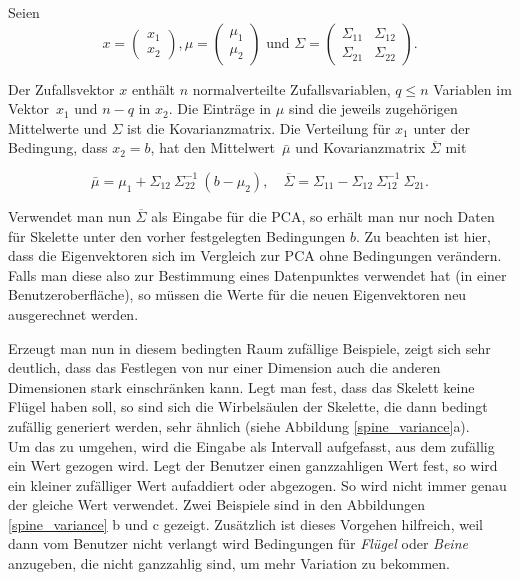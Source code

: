  Seien 
 \[x = \begin{pmatrix} x_1 \\ x_2 \end{pmatrix}, 
  \mu = \begin{pmatrix} \mu_1 \\ \mu_2 \end{pmatrix} \text{ und }
  \Sigma = \begin{pmatrix} \Sigma_{11} & \Sigma_{12} \\ \Sigma_{21} & \Sigma_{22} \end{pmatrix}. \] 
 
 Der Zufallsvektor $x$ enthält $n$ normalverteilte Zufallsvariablen, $q \le n$ Variablen im \mbox{Vektor $x_1$} und $n - q$ in $x_2$. Die Einträge in $\mu$ sind die jeweils zugehörigen Mittelwerte und $\Sigma$ ist die Kovarianzmatrix. Die Verteilung für $x_1$ unter der Bedingung, dass $x_2 = b$, hat den \mbox{Mittelwert $\bar{\mu}$} und Kovarianzmatrix $\overline{\Sigma}$ mit
 
 \[ \bar{\mu} = \mu_1 + \Sigma_{12}~ \Sigma_{22}^{-1}~ (b - \mu_2), \quad
    \overline{\Sigma} = \Sigma_{11} - \Sigma_{12}~ \Sigma_{12}^{-1}~ \Sigma_{21}. \]
 
 Verwendet man nun $\overline{\Sigma}$ als Eingabe für die PCA, so erhält man nur noch Daten für Skelette unter den vorher festgelegten Bedingungen $b$. Zu beachten ist hier, dass die Eigenvektoren sich im Vergleich zur PCA ohne Bedingungen verändern. Falls man diese also zur Bestimmung eines Datenpunktes verwendet hat (\zb in einer Benutzeroberfläche), so müssen die Werte für die neuen Eigenvektoren neu ausgerechnet werden.
 
 Erzeugt man nun in diesem bedingten Raum zufällige Beispiele, zeigt sich sehr deutlich, dass das Festlegen von nur einer Dimension auch die anderen Dimensionen stark einschränken kann. Legt man \zb fest, dass das Skelett keine Flügel haben soll, so sind sich die Wirbelsäulen der Skelette, die dann bedingt zufällig generiert werden, sehr ähnlich (siehe Abbildung \ref{spine_variance}a).\\
 Um das zu umgehen, wird die Eingabe als Intervall aufgefasst, aus dem zufällig ein Wert gezogen wird. Legt der Benutzer \zb einen ganzzahligen Wert fest, so wird ein kleiner zufälliger Wert aufaddiert oder abgezogen. So wird nicht immer genau der gleiche Wert verwendet. Zwei Beispiele sind in den Abbildungen \ref{spine_variance} b und c gezeigt. Zusätzlich ist dieses Vorgehen hilfreich, weil dann vom Benutzer nicht verlangt wird Bedingungen für \emph{Flügel} oder \emph{Beine} anzugeben, die nicht ganzzahlig sind, um mehr Variation zu bekommen. 
 

